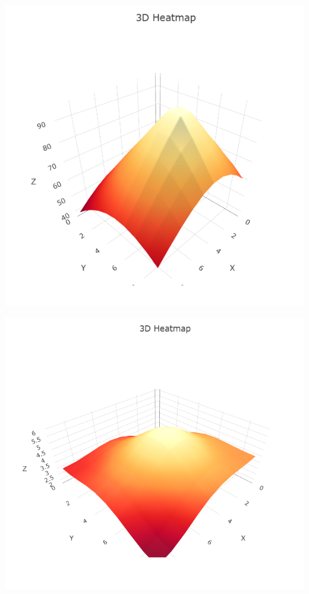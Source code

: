 \begin{center}
  \begin{minipage}[b]{0.4\textwidth}
    \includegraphics[width=\textwidth]{../images/Heatmap/WCLHeatmap.png}
  \end{minipage}
  \hfill
  \begin{minipage}[b]{0.4\textwidth}
    \includegraphics[width=\textwidth]{../images/Heatmap/IDWWCLHeatmap.png}
  \end{minipage}
\end{center}